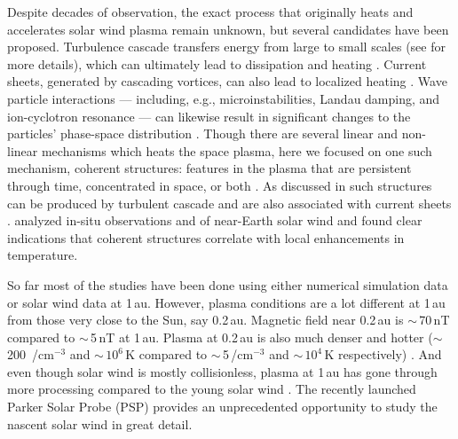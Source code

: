         Despite decades of observation, the exact process that originally heats and accelerates
        solar wind plasma remain unknown, but several candidates have been proposed. Turbulence
        cascade transfers energy from large to small scales (see  for more
        details), which can ultimately lead to dissipation and heating \citep{Velli1989, Velli1993,
        Matthaeus1999, Dmitruk2002, Cranmer2005, Cranmer2007, Cranmer2012, Cranmer2014, Verdini2007,
        Verdini2009, Verdini2009a, Chandran2009, Perez2013, Lionello2014}. Current sheets, generated
        by cascading vortices, can also lead to localized heating \citep{Parashar2009, Osman2011,
        Osman2012, Osman2012a, Gingell2015}. Wave particle interactions --- including, e.g.,
        microinstabilities, Landau damping, and ion-cyclotron resonance --- can likewise result in
        significant changes to the particles' phase-space distribution \citep{Gary1993,
        Sahraoui2010, Klein2015}. Though there are several linear and non-linear mechanisms which
        heats the space plasma, here we focused on one such mechanism, coherent structures: features
        in the plasma that are persistent through time, concentrated in space, or both
        \citep{Greco2018}. As discussed in  such structures can be produced by
        turbulent cascade \citep{Osman2012a} and are also associated with current sheets
        \citep{Yordanova2016}. \citet{Osman2011, Osman2012a} analyzed in-situ observations and of
        near-Earth solar wind and found clear indications that coherent structures correlate with
        local enhancements in temperature.

        So far most of the studies have been done using either numerical simulation data or solar
        wind data at 1\,au. However, plasma conditions are a lot different at 1\,au from those very
        close to the Sun, say 0.2\,au. Magnetic field near 0.2\,au is $\sim$\,70\,nT compared to
        $\sim$\,5\,nT at 1\,au. Plasma at 0.2\,au is also much denser and hotter ($\sim$\,200\,
        /$\mathrm{cm^{-3}}$ and $\sim\,10^6$\,K compared to $\sim$\,5\,/$\mathrm{cm^{-3}}$ and
        $\sim\,10^4$\,K respectively) \citep{Kasper2019}. And even though solar wind is mostly
        collisionless, plasma at 1\,au has gone through more processing compared to the young solar
        wind \cite[\S3.3 \& references therein]{Verscharen2019}. The recently launched Parker Solar
        Probe (PSP) provides an unprecedented opportunity to study the nascent solar wind in great
        detail.

